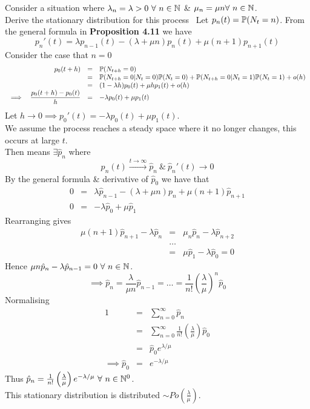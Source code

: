 \documentclass[11pt,a4paper]{article}
\begin{document}
Consider a situation where $\lambda_n=\lambda>0\ \forall\ n\in\mathbb{N}$ \& $\mu_n=\mu n\forall\ n\in\nats$.\\
Derive the stationary distribution for this process
\
Let $p_n(t)=\mathbb{P}(N_t=n)$. From the general formula in \textbf{Proposition 4.11} we have
$$p_n'(t)=\lambda p_{n-1}(t)-(\lambda+\mu n)p_n(t)+\mu(n+1)p_{n+1}(t)$$
Consider the case that $n=0$
\[\begin{array}{rrcl}
&p_0(t+h)&=&\mathbb{P}(N_{t+h}=0)\\
&&=&\mathbb{P}(N_{t+h}=0|N_t=0)\mathbb{P}(N_t=0)+\mathbb{P}(N_{t+h}=0|N_t=1)\mathbb{P}(N_t=1)+o(h)\\
&&=&(1-\lambda h)p_0(t)+\mu hp_1(t)+o(h)\\
\implies&\dfrac{p_0(t+h)-p_0(t)}{h}&=&-\lambda p_0(t)+\mu p_1(t)
\end{array}\]
Let $h\to0\implies p_0'(t)=-\lambda p_0(t)+\mu p_1(t)$.\\
We assume the process reaches a steady space where it no longer changes, this occurs at large $t$.\\
Then means $\exists \hat{p}_n$ where
$$p_n(t)\xrightarrow{t\to\infty}\hat{p}_n\ \&\ \hat{p}_n'(t)\to 0$$
By the general formula \& derivative of $\hat{p}_0$ we have that
\[\begin{array}{rcl}
0&=&\lambda\hat{p}_{n-1}-(\lambda+\mu n)p_n+\mu(n+1)\hat{p}_{n+1}\\
0&=&-\lambda\hat{p}_0+\mu\hat{p}_1
\end{array}\]
Rearranging gives
\[\begin{array}{rcl}
\mu(n+1)\hat{p}_{n+1}-\lambda\hat{p}_{n}&=&\mu_n\hat{p}_{n}-\lambda\hat{p}_{n+2}\\
&\dots&\\
&=&\mu\hat{p}_{1}-\lambda\hat{p}_{0}=0
\end{array}\]
Hence $\mu n\hat{p}_{n}-\lambda\hat{p}_{n-1}=0\ \forall\ n\in\nats$.\\
$$\implies\hat{p}_{n}=\dfrac{\lambda}{\mu n}\hat{p}_{n-1}=\dots=\dfrac{1}{n!}\left(\frac{\lambda}{\mu}\right)^n\hat{p}_{0}$$
Normalising
\[\begin{array}{rcl}
1&=&\sum_{n=0}^\infty\hat{p}_{n}\\
&=&\sum_{n=0}^\infty\frac{1}{n!}\left(\frac{\lambda}{\mu}\right)\hat{p}_{0}\\
&=&\hat{p}_{0}e^{\lambda/\mu}\\
\implies\hat{p}_{0}&=&e^{-\lambda/\mu}
\end{array}\]
Thus $\hat{p}_{n}=\frac{1}{n!}\left(\frac{\lambda}{\mu}\right)e^{-\lambda/\mu}\ \forall\ n\in\nats^0$.\\
This stationary distribution is distributed $\sim Po\left(\frac{\lambda}{\mu}\right)$.\\
\end{document}
